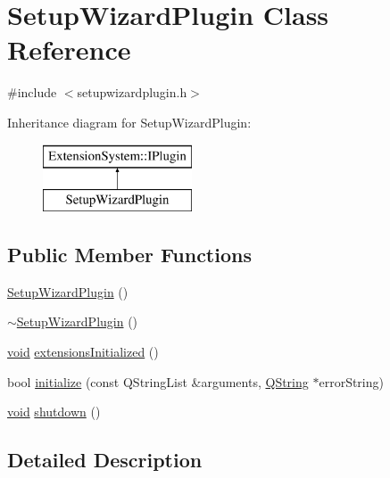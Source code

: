 \hypertarget{class_setup_wizard_plugin}{\section{\-Setup\-Wizard\-Plugin \-Class \-Reference}
\label{class_setup_wizard_plugin}
}


{\ttfamily \#include $<$setupwizardplugin.\-h$>$}

\-Inheritance diagram for \-Setup\-Wizard\-Plugin\-:\begin{figure}[H]
\begin{center}
\leavevmode
\includegraphics[height=2.000000cm]{class_setup_wizard_plugin}
\end{center}
\end{figure}
\subsection*{\-Public \-Member \-Functions}
\begin{DoxyCompactItemize}
\item 
\hyperlink{group___setup_wizard_plugin_ga3aa7966c2f38a762e4669751ccdf470a}{\-Setup\-Wizard\-Plugin} ()
\item 
\hyperlink{group___setup_wizard_plugin_ga57537cb52f05ade3a3fbe59ca00d187b}{$\sim$\-Setup\-Wizard\-Plugin} ()
\item 
\hyperlink{group___u_a_v_objects_plugin_ga444cf2ff3f0ecbe028adce838d373f5c}{void} \hyperlink{group___setup_wizard_plugin_gaa612baf865ac69fa057ec64987c86ff4}{extensions\-Initialized} ()
\item 
bool \hyperlink{group___setup_wizard_plugin_ga2ea2069466d237ee561815a5a00f7a4e}{initialize} (const \-Q\-String\-List \&arguments, \hyperlink{group___u_a_v_objects_plugin_gab9d252f49c333c94a72f97ce3105a32d}{\-Q\-String} $\ast$error\-String)
\item 
\hyperlink{group___u_a_v_objects_plugin_ga444cf2ff3f0ecbe028adce838d373f5c}{void} \hyperlink{group___setup_wizard_plugin_ga982d4e38aff329d0dfc32506a4eb5539}{shutdown} ()
\end{DoxyCompactItemize}


\subsection{\-Detailed \-Description}


